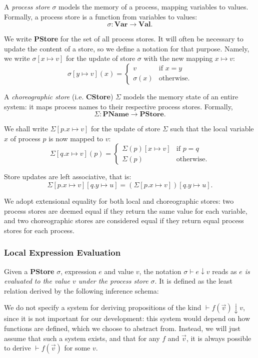 \documentclass[12pt,a4paper,twoside]{book}
\begin{document}
A \textit{process store} $\sigma$ models the memory of a process, mapping variables to values. Formally, a process store is a function from variables to values:
\[
\sigma : \textbf{Var} \longrightarrow \textbf{Val}.
\]

We write \textbf{PStore} for the set of all process stores. It will often be necessary to update the content of a store, so we define a notation for that purpose. Namely, we write $\sigma[x \mapsto v]$ for the update of store $\sigma$ with the new mapping $x \mapsto v$:
\[
\sigma[y \mapsto v](x) =
\begin{cases}
v & \text{if } x = y \\
\sigma(x) & \text{otherwise}.
\end{cases}
\]

A \textit{choreographic store} (i.e. \textbf{CStore}) $\Sigma$ models the memory state of an entire system: it maps process names to their respective process stores. Formally,
\[
\Sigma : \textbf{PName} \longrightarrow \textbf{PStore}.
\]

We shall write $\Sigma[p.x \mapsto v]$ for the update of store $\Sigma$ such that the local variable $x$ of process $p$ is now mapped to $v$:
\[
\Sigma[q.x \mapsto v](p) =
\begin{cases}
\Sigma(p)[x \mapsto v] & \text{if } p = q \\
\Sigma(p) & \text{otherwise}.
\end{cases}
\]

Store updates are left associative, that is:
\[
\Sigma[p.x \mapsto v][q.y \mapsto u] = (\Sigma[p.x \mapsto v])[q.y \mapsto u].
\]

We adopt extensional equality for both local and choreographic stores: two process stores are deemed equal if they return the same value for each variable, and two choreographic stores are considered equal if they return equal process stores for each process.

\subsubsection{Local Expression Evaluation}
Given a \textbf{PStore} $\sigma$, expression $e$ and value $v$, the notation $\sigma \vdash e \downarrow v$ reads as \textit{$e$ is evaluated to the value $v$ under the process store $\sigma$}. It is defined as the least relation derived by the following inference schema:
We do not specify a system for deriving propositions of the kind $\vdash f(\vec{v}) \downarrow v$, since it is not
important for our development: this system would depend on how functions are defined, which
we choose to abstract from. Instead, we will just assume that such a system exists, and that for
any $f$ and $\vec{v}$, it is always possible to derive $\vdash f(\vec{v})$ for some $v$.
\end{document}
